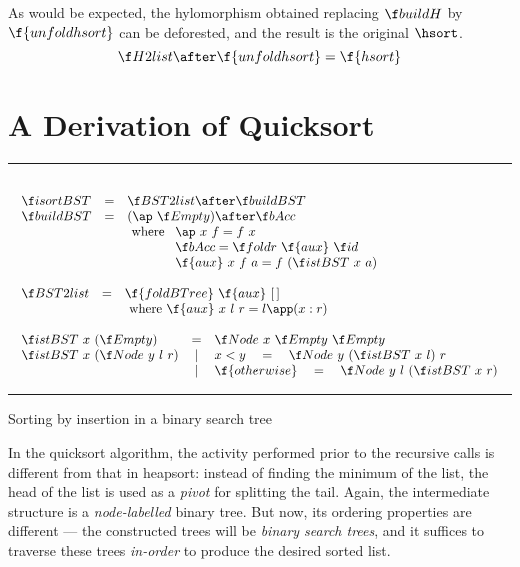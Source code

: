 \documentclass[a4paper,11pt]{llncs}
\begin{document}
As would be expected, the hylomorphism obtained replacing $\buildH$ by
$\f{unfoldhsort}$ can be deforested, and the result is the original
$\hsort$.
\[ \H2list\after\f{unfoldhsort} = \f{hsort} \]






\section{A Derivation of Quicksort}
\label{sec:deriv-quick-sort}


\begin{table}[tb]
\hrule
\[
\begin{array}{l}\\
\begin{array}{lcl}
\isortBST  & = & \BST2list \after \buildBST\\
\buildBST & = & (\ap\ \Empty) \after \buildBSTacc\\
&& \mbox{ where } 
\begin{array}[t]{l}
\ap\ x\ f = f\ x  \\
\buildBSTacc = \foldr\ \f{aux}\ \id \\
\f{aux}\ x\ f\ a = f\ (\istBST\ x\ a)
\end{array}
\end{array}
\\ \\
\begin{array}{lcl}
\BST2list & = & \f{foldBTree}\ \f{aux}\ \Nil\\
&& \mbox{ where } \f{aux}\ x\ l\ r = l \app (x:r)
\end{array}
\\ \\
\begin{array}{lcl}
  \istBST\ x\ (\Empty) & = &  \Node\ x\ \Empty\ \Empty\\
  \istBST\ x\ (\Node\ y\ l\ r) & | & x<y\quad=\quad \Node\ y\
  (\istBST\ x\ l)\ r\\
  & | & \f{otherwise}\quad=\quad \Node\ y\ l\ (\istBST\ x\ r)
\end{array}
\end{array}
\]
\hrule
\caption{Sorting by insertion in a binary search tree}
\label{tab:sortiBST}
\end{table}

In the quicksort algorithm, the activity performed prior to the
recursive calls is different from that in heapsort: instead of finding
the minimum of the list, the head of the list is used as a
\emph{pivot} for splitting the tail. Again, the intermediate structure
is a \emph{node-labelled} binary tree. But now, its ordering
properties are different --- the constructed trees will be
\emph{binary search trees}, and it suffices to traverse these trees
\emph{in-order} to produce the desired sorted list.
\end{document}
